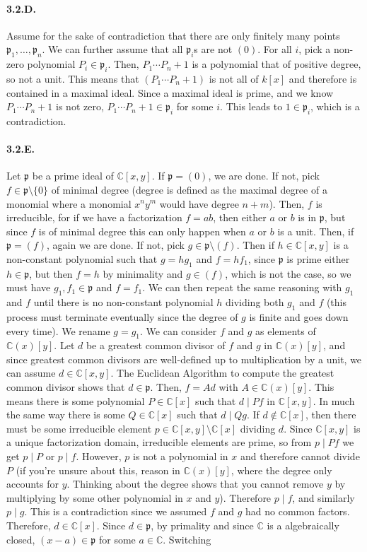 \documentclass{article}
\newcommand{\C}{\mathbb{C}}
\newcommand{\p}{\mathfrak{p}}
\begin{document}
\paragraph{3.2.D.} Assume for the sake of contradiction that there are only finitely many points $\p_1, \dots, \p_n$. We can further assume that all $\p_i$s are not $(0)$. For all $i$, pick a non-zero polynomial $P_i \in \p_i$. Then, $P_1 \cdots P_n + 1$ is a polynomial that of positive degree, so not a unit. This means that $(P_1 \cdots P_n + 1)$ is not all of $k[x]$ and therefore is contained in a maximal ideal. Since a maximal ideal is prime, and we know $P_1 \cdots P_n + 1$ is not zero, $P_1 \cdots P_n + 1 \in \p_i$ for some $i$. This leads to $1 \in \p_i$, which is a contradiction.

\paragraph{3.2.E.} Let $\p$ be a prime ideal of $\C[x,y]$. If $\p = (0)$, we are done. If not, pick $f \in \p \setminus \{0\}$ of minimal degree (degree is defined as the maximal degree of a monomial where a monomial $x^n y^m$ would have degree $n+m$). Then, $f$ is irreducible, for if we have a factorization $f = ab$, then either $a$ or $b$ is in $\p$, but since $f$ is of minimal degree this can only happen when $a$ or $b$ is a unit. Then, if $\p = (f)$, again we are done. If not, pick $g \in \p\setminus (f)$. Then if $h \in \C[x,y]$ is a non-constant polynomial such that $g = hg_1$ and $f = hf_1$, since $\p$ is prime either $h \in \p$, but then $f = h$ by minimality and $g \in (f)$, which is not the case, so we must have $g_1, f_1 \in \p$ and $f = f_1$. We can then repeat the same reasoning with $g_1$ and $f$ until there is no non-constant polynomial $h$ dividing both $g_1$ and $f$ (this process must terminate eventually since the degree of $g$ is finite and goes down every time). We rename $g = g_1$. We can consider $f$ and $g$ as elements of $\C(x)[y]$. Let $d$ be a greatest common divisor of $f$ and $g$ in $\C(x)[y]$, and since greatest common divisors are well-defined up to multiplication by a unit, we can assume $d \in \C[x,y]$. The Euclidean Algorithm to compute the greatest common divisor shows that $d \in \p$. Then, $f = Ad$ with $A \in \C(x)[y]$. This means there is some polynomial $P \in \C[x]$ such that $d \mid Pf$ in $\C[x,y]$. In much the same way there is some $Q \in \C[x]$ such that $d \mid Qg$. If $d \notin \C[x]$, then there must be some irreducible element $p \in \C[x,y] \setminus \C[x]$ dividing $d$. Since $\C[x,y]$ is a unique factorization domain, irreducible elements are prime, so from $p \mid Pf$ we get $p \mid P$ or $p\mid f$. However, $p$ is not a polynomial in $x$ and therefore cannot divide $P$ (if you're unsure about this, reason in $\C(x)[y]$, where the degree only accounts for $y$. Thinking about the degree shows that you cannot remove $y$ by multiplying by some other polynomial in $x$ and $y$). Therefore $p \mid f$, and similarly $p \mid g$. This is a contradiction since we assumed $f$ and $g$ had no common factors. Therefore, $d \in \C[x]$. Since $d \in \p$, by primality and since $\C$ is a algebraically closed, $(x-a) \in \p$ for some $a \in \C$. Switching 
\end{document}
